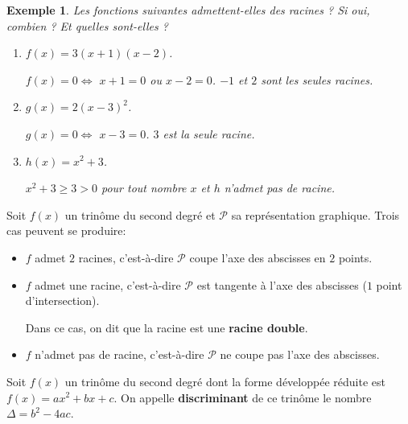 \documentclass[a4paper,11pt]{article}
\theoremstyle{break}
\newcounter{enonce}
\newtheorem{exemple}[enonce]{Exemple}
\begin{document}
  \begin{exemple}
    Les fonctions suivantes admettent-elles des racines ? Si oui, combien ? 
    Et quelles sont-elles ?
    \begin{enumerate}
     \item $f(x)=3(x+1)(x-2)$. 
     
     $f(x)=0 \Leftrightarrow $ $x+1=0$ ou $x-2=0$. $-1$ et $2$ sont les seules racines.
     \item $g(x)=2(x-3)^2$. 
     
     $g(x)=0 \Leftrightarrow $ $x-3=0$. $3$ est la seule racine.
     \item $h(x)=x^2+3$. 
     
     $x^2+3 \geq 3 >0$ pour tout nombre $x$ et $h$ n'admet pas de racine.
    \end{enumerate}
  \end{exemple}
  
  \newpage 
  
  \begin{proposition}
   Soit $f(x)$ un trinôme du second degré et $\mathcal{P}$ sa représentation graphique.
    Trois cas peuvent se produire:
   
   \begin{itemize}
    \item $f$ admet $2$ racines, c'est-à-dire $\mathcal{P}$ coupe l'axe des abscisses 
    en $2$ points.
    \item $f$ admet une racine, c'est-à-dire $\mathcal{P}$ est tangente à l'axe
    des abscisses ($1$ point d'intersection).
    
    Dans ce cas, on dit que la racine est une \textbf{racine double}.
    
    \item $f$ n'admet pas de racine, c'est-à-dire $\mathcal{P}$ ne coupe pas l'axe des abscisses.
   \end{itemize}
   
  \end{proposition}
  
  
  
  
  \begin{definition}[Discriminant]
    Soit $f(x)$ un trinôme du second degré dont la forme développée réduite
    est $f(x)=ax^2+bx+c$. On appelle \textbf{discriminant} de ce trinôme
    le nombre $\Delta=b^2-4ac$.
    
    
  \end{definition}
  
\end{document}
